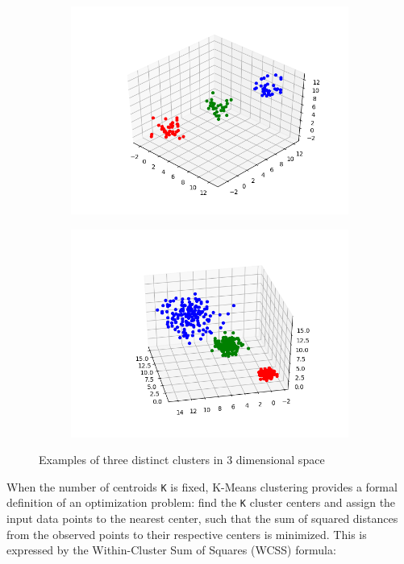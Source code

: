 \documentclass{l4proj}
\begin{document}
\begin{figure}[H]
\centering
\begin{subfigure}{.5\textwidth}
  \centering
  \includegraphics[width=1.2\linewidth]{images/figure_1}
  \label{fig:sub3}
\end{subfigure}%
\begin{subfigure}{.5\textwidth}
  \centering
  \includegraphics[width=1.2\linewidth]{images/figure_2}
  \label{fig:sub4}
\end{subfigure}
\caption{Examples of three distinct clusters in 3 dimensional space}
\label{basic clusters}
\end{figure}

When the number of centroids \texttt{K} is fixed, K-Means clustering provides a formal definition of an optimization problem: find the \texttt{K} cluster centers and assign the input data points to the nearest center, such that the sum of squared distances from the observed points to their respective centers is minimized. This is expressed by the Within-Cluster Sum of Squares (WCSS) formula:
\end{document}
